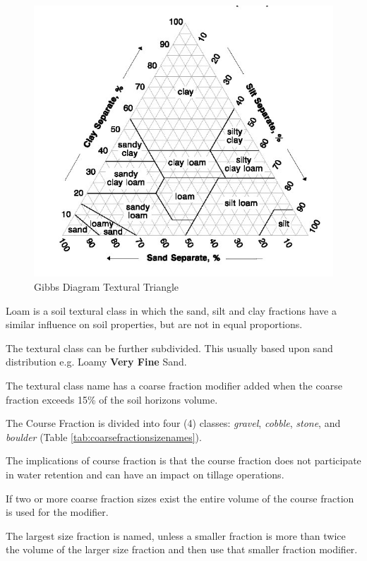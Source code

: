 \documentclass{article}
\begin{document}
\begin{figure}
    \centering
    \includegraphics{images/TexturalTriangle.jpg}
    \caption{Gibbs Diagram Textural Triangle}
    \label{fig:TexturalTriangle}
\end{figure}
    
Loam is a soil textural class in which the sand, silt and clay fractions have a similar influence on soil properties, but are not in equal proportions.
    
The textural class can be further subdivided. This usually based upon sand distribution e.g. Loamy \textbf{Very Fine} Sand.
    
The textural class name has a coarse fraction modifier added when the coarse fraction exceeds 15\% of the soil horizons volume.
    
The Course Fraction is divided into four (4) classes: \textit{gravel}, \textit{cobble}, \textit{stone}, and \textit{boulder} (Table \ref{tab:coarsefractionsizenames}).
    
The implications of course fraction is that the course fraction does not participate in water retention and can have an impact on tillage operations.
    
If two or more coarse fraction sizes exist the entire volume of the course fraction is used for the modifier.
    
The largest size fraction is named, unless a smaller fraction is more than twice the volume of the larger size fraction and then use that smaller fraction modifier.
\end{document}
